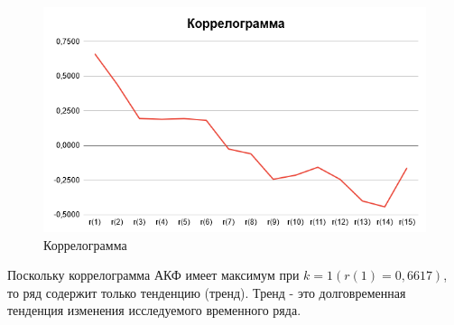 \documentclass[utf8, a4paper, 14pt, russian, oneside]{book}
\begin{document}
\begin{figure}[h!]
    \centering
    \includegraphics{img/correlogramma.png}
    \caption{Коррелограмма}
\end{figure}
Поскольку коррелограмма АКФ имеет максимум при $k=1 (r(1) = 0,6617)$, то ряд содержит только тенденцию (тренд).
Тренд - это долговременная тенденция изменения исследуемого временного ряда.

\newpage
\end{document}
